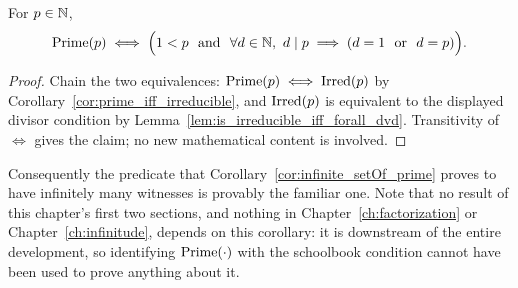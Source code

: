 \begin{corollary}
  \leanok
  \label{cor:prime_iff_forall_dvd}
  For $p \in \mathbb{N}$,
  \[
    \Prm{p} \iff \Bigl(1 < p \ \text{ and }\ \forall d \in \NN,\
      d \mid p \implies (d = 1 \ \text{ or }\ d = p)\Bigr).
  \]
\end{corollary}
\begin{proof}
  \leanok
  Chain the two equivalences: $\mathrm{Prime}(p) \iff \mathrm{Irred}(p)$ by
  Corollary~\ref{cor:prime_iff_irreducible}, and $\mathrm{Irred}(p)$ is equivalent to the
  displayed divisor condition by
  Lemma~\ref{lem:is_irreducible_iff_forall_dvd}. Transitivity of $\iff$ gives
  the claim; no new mathematical content is involved.
\end{proof}

Consequently the predicate that Corollary~\ref{cor:infinite_setOf_prime} proves
to have infinitely many witnesses is provably the familiar one. Note that no
result of this chapter's first two sections, and nothing in
Chapter~\ref{ch:factorization} or Chapter~\ref{ch:infinitude}, depends on this
corollary: it is downstream of the entire development, so identifying
$\mathrm{Prime}(\cdot)$ with the schoolbook condition cannot have been used to prove
anything about it.
